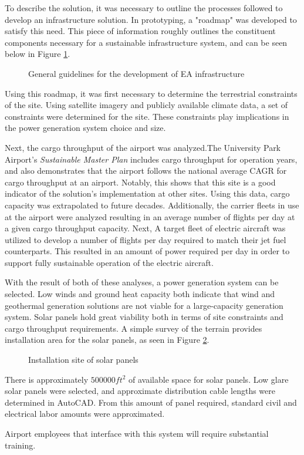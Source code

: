 \documentclass[../main.tex]{subfiles}
\begin{document}
To describe the solution, it was necessary to outline the processes followed to develop an infrastructure solution. In prototyping, a "roadmap" was developed to satisfy this need. This piece of information roughly outlines the constituent components necessary for a sustainable infrastructure system, and can be seen below in Figure \ref{fig:roadmap}.
\begin{figure}[h!]
    \centering
    \caption{General guidelines for the development of EA infrastructure}
    \label{fig:roadmap}
    \centering
\end{figure}
\FloatBarrier
Using this roadmap, it was first necessary to determine the terrestrial constraints of the site. Using satellite imagery and publicly available climate data, a set of constraints were determined for the site. These constraints play implications in the power generation system choice and size.\par
Next, the cargo throughput of the airport was analyzed.The University Park Airport's \emph{Sustainable Master Plan} includes cargo throughput for operation years, and also demonstrates that the airport follows the national average CAGR for cargo throughput at an airport. Notably, this shows that this site is a good indicator of the solution's implementation at other sites. Using this data, cargo capacity was extrapolated to future decades. Additionally, the carrier fleets in use at the airport were analyzed resulting in an average number of flights per day at a given cargo throughput capacity. Next, A target fleet of electric aircraft was utilized to develop a number of flights per day required to match their jet fuel counterparts. This resulted in an amount of power required per day in order to support fully sustainable operation of the electric aircraft.\par
With the result of both of these analyses, a power generation system can be selected. Low winds and ground heat capacity both indicate that wind and geothermal generation solutions are not viable for a large-capacity generation system. Solar panels hold great viability both in terms of site constraints and cargo throughput requirements. A simple survey of the terrain provides installation area for the solar panels, as seen in Figure \ref{fig:panelSites}.\par
\begin{figure}[h!]
    \centering
    \caption{Installation site of solar panels}
    \label{fig:panelSites}
    \centering
\end{figure}
\FloatBarrier
There is approximately $500000ft^{2}$ of available space for solar panels. Low glare solar panels were selected, and approximate distribution cable lengths were determined in AutoCAD. From this amount of panel required, standard civil and electrical labor amounts were approximated.\par
Airport employees that interface with this system will require substantial training.
\end{document}
